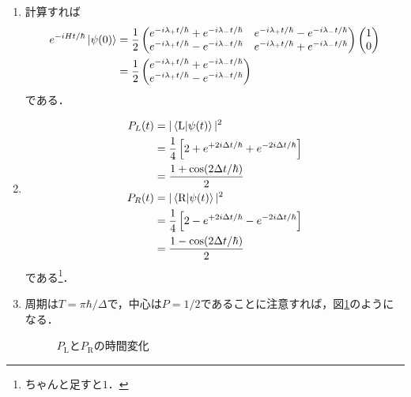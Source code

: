 \documentclass[a4paper,pdflatex,ja=standard]{bxjsarticle}
\begin{document}
\begin{enumerate}
  \item 
  計算すれば
  \begin{align*}
    e^{-iHt/\hbar}\ket{\psi(0)}
    &=
    \frac{1}{2}
    \begin{pmatrix}
      e^{-i\lambda_{+}t/\hbar}+e^{-i\lambda_{-}t/\hbar}
      &
      e^{-i\lambda_{+}t/\hbar}-e^{-i\lambda_{-}t/\hbar}
      \\
      e^{-i\lambda_{+}t/\hbar}-e^{-i\lambda_{-}t/\hbar}
      &
      e^{-i\lambda_{+}t/\hbar}+e^{-i\lambda_{-}t/\hbar}
    \end{pmatrix}
    \begin{pmatrix}
      1 \\
      0
    \end{pmatrix}
    \nonumber
    \\
    &=
    \frac{1}{2}
    \begin{pmatrix}
      e^{-i\lambda_{+}t/\hbar}+e^{-i\lambda_{-}t/\hbar}
      \\
      e^{-i\lambda_{+}t/\hbar}-e^{-i\lambda_{-}t/\hbar}
    \end{pmatrix}
  \end{align*}
  である．

  \item 
  \begin{align*}
    P_{L}(t)
    &=
    |\braket{\text{L}|\psi(t)}|^2
    \nonumber
    \\
    &=
    \frac{1}{4}\left[ 2+e^{+2i\Delta t/\hbar}+e^{-2i\Delta t/\hbar} \right]
    \nonumber
    \\
    &=
    \frac{1+\cos(2\Delta t/\hbar)}{2}
    \\
    P_{R}(t)
    &=
    |\braket{\text{R}|\psi(t)}|^2
    \nonumber
    \\
    &=
    \frac{1}{4}\left[ 2-e^{+2i\Delta t/\hbar}-e^{-2i\Delta t/\hbar} \right]
    \nonumber
    \\
    &=
    \frac{1-\cos(2\Delta t/\hbar)}{2}
  \end{align*}
  である\footnote{ちゃんと足すと$1$．}．

  \item 
  周期は$T=\pi\hbar/\Delta$で，中心は$P=1/2$であることに注意すれば，図\ref{PLPR}のようになる．

  \begin{figure}[ht]
    \centering    
      \caption{$P_{\text{L}}$と$P_{{\text{R}}}$の時間変化}
      \label{PLPR}
  \end{figure}

\end{enumerate}
\end{document}

